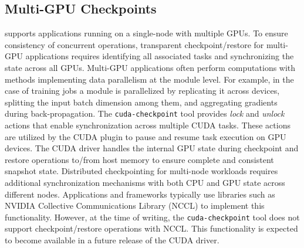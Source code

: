 \subsection{Multi-GPU Checkpoints}
\sys supports applications running on a single-node with multiple GPUs. To ensure consistency of concurrent operations, transparent checkpoint/restore for multi-GPU applications requires identifying all associated tasks and synchronizing the state across all GPUs. Multi-GPU applications often perform computations with methods implementing data parallelism at the module level. For example, in the case of training jobs a module is parallelized by replicating it across devices, splitting the input batch dimension among them, and aggregating gradients during back-propagation. The \texttt{cuda-checkpoint} tool provides \textit{lock} and \textit{unlock} actions that enable synchronization across multiple CUDA tasks. These actions are utilized by the CUDA plugin to pause and resume task execution on GPU devices. The CUDA driver handles the internal GPU state during checkpoint and restore operations to/from host memory to ensure complete and consistent snapshot state.
% 
Distributed checkpointing for multi-node workloads requires additional synchronization mechanisms with both CPU and GPU state across different nodes. Applications and frameworks typically use libraries such as NVIDIA Collective Communications Library (NCCL) to implement this functionality. However, at the time of writing, the \texttt{cuda-checkpoint} tool does not support checkpoint/restore operations with NCCL. This functionality is expected to become available in a future release of the CUDA driver.
